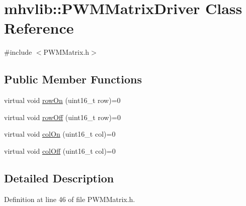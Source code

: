 \hypertarget{classmhvlib_1_1_p_w_m_matrix_driver}{\section{mhvlib\-:\-:P\-W\-M\-Matrix\-Driver Class Reference}
\label{classmhvlib_1_1_p_w_m_matrix_driver}
}


{\ttfamily \#include $<$P\-W\-M\-Matrix.\-h$>$}

\subsection*{Public Member Functions}
\begin{DoxyCompactItemize}
\item 
virtual void \hyperlink{classmhvlib_1_1_p_w_m_matrix_driver_a31b4360f8609e47eb60e42f33f1e845b}{row\-On} (uint16\-\_\-t row)=0
\item 
virtual void \hyperlink{classmhvlib_1_1_p_w_m_matrix_driver_af5766c1e61005bc6e3cbe078e9e7632d}{row\-Off} (uint16\-\_\-t row)=0
\item 
virtual void \hyperlink{classmhvlib_1_1_p_w_m_matrix_driver_aa69f35d7308b81eac5364e7ba640607c}{col\-On} (uint16\-\_\-t col)=0
\item 
virtual void \hyperlink{classmhvlib_1_1_p_w_m_matrix_driver_ab03554ef86f53e3050e7fb9c1a5044ca}{col\-Off} (uint16\-\_\-t col)=0
\end{DoxyCompactItemize}


\subsection{Detailed Description}


Definition at line 46 of file P\-W\-M\-Matrix.\-h.



